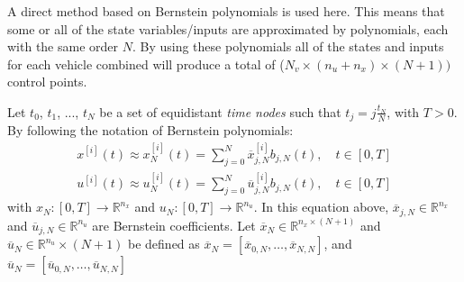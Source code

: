 \par A direct method based on Bernstein polynomials is used here. This means that some or all of the state variables/inputs are approximated by polynomials, each with the same order $N$. By using these polynomials all of the states and inputs for each vehicle combined will produce a total of ($N_v \times (n_u+n_x)\times (N+1))$ control points.
\par Let $t_0$, $t_1$, ..., $t_N$ be a set of equidistant \textit{time nodes} such that $t_j= j\frac{t_N}{N}$, with $T>0$. By following the notation of Bernstein polynomials:
\begin{equation}
    \begin{gathered}
        x^{[i]}(t) \approx x_N^{[i]}(t) = \sum_{j=0}^N \overline{x}^{[i]}_{j,N} b_{j,N}(t), \quad t\in[0,T] \\
        u^{[i]}(t) \approx u_N^{[i]}(t) = \sum_{j=0}^N \overline{u}^{[i]}_{j,N} b_{j,N}(t), \quad t\in[0,T]
    \end{gathered}
\end{equation}
with $x_N: [0,T]\rightarrow \mathbb{R}^{n_x}$ and $u_N:[0,T]\rightarrow \mathbb{R}^{n_u}$. In this equation above, $\overline{x}_{j,N}\in \mathbb{R}^{n_x}$ and $\overline{u}_{j,N}\in \mathbb{R}^{n_u}$ are Bernstein coefficients. Let $\overline{x}_N\in \mathbb{R}^{n_x\times (N+1)}$ and $\overline{u}_N\in \mathbb{R}^{n_u}\times(N+1)$ be defined as $\overline{x}_N = [\overline{x}_{0,N},\dots, \overline{x}_{N,N}]$, and $\overline{u}_N = [\overline{u}_{0,N},\dots, \overline{u}_{N,N}]$

